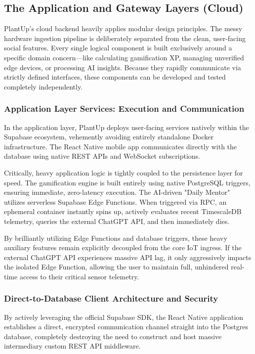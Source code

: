 \subsection{The Application and Gateway Layers (Cloud)}

PlantUp's cloud backend heavily applies modular design principles. The messy hardware ingestion pipeline is deliberately separated from the clean, user-facing social features. Every single logical component is built exclusively around a specific domain concern—like calculating gamification XP, managing unverified edge devices, or processing AI insights. Because they rapidly communicate via strictly defined interfaces, these components can be developed and tested completely independently.

\subsubsection{Application Layer Services: Execution and Communication}

In the application layer, PlantUp deploys user-facing services natively within the Supabase ecosystem, vehemently avoiding entirely standalone Docker infrastructure. The React Native mobile app communicates directly with the database using native REST APIs and WebSocket subscriptions.

Critically, heavy application logic is tightly coupled to the persistence layer for speed. The gamification engine is built entirely using native PostgreSQL triggers, ensuring immediate, zero-latency execution. The AI-driven "Daily Mentor" utilizes serverless Supabase Edge Functions. When triggered via RPC, an ephemeral container instantly spins up, actively evaluates recent TimescaleDB telemetry, queries the external ChatGPT API, and then immediately dies. 

By brilliantly utilizing Edge Functions and database triggers, these heavy auxiliary features remain explicitly decoupled from the core IoT ingress. If the external ChatGPT API experiences massive API lag, it only aggressively impacts the isolated Edge Function, allowing the user to maintain full, unhindered real-time access to their critical sensor telemetry.

\subsubsection{Direct-to-Database Client Architecture and Security}

By actively leveraging the official Supabase SDK, the React Native application establishes a direct, encrypted communication channel straight into the Postgres database, completely destroying the need to construct and host massive intermediary custom REST API middleware. 

